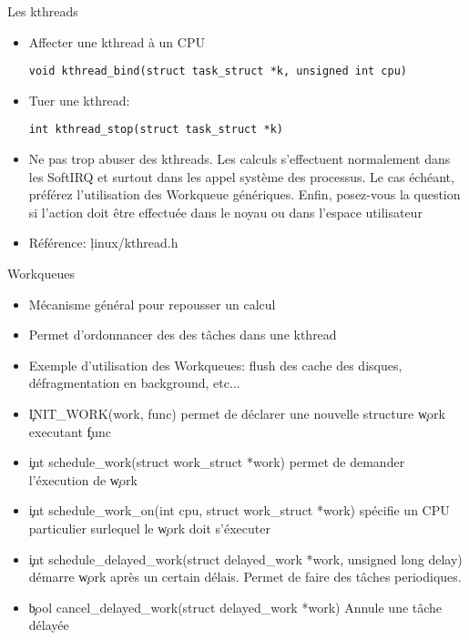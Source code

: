 \begin{frame}[fragile=singleslide]{Les kthreads}
  \begin{itemize}
  \item Affecter une kthread à un CPU
    \begin{lstlisting}
void kthread_bind(struct task_struct *k, unsigned int cpu)
    \end{lstlisting} 
  \item Tuer une kthread:
    \begin{lstlisting} 
int kthread_stop(struct task_struct *k)
    \end{lstlisting} 
  \item  Ne pas  trop abuser  des kthreads.  Les  calculs s'effectuent
    normalement dans les SoftIRQ et surtout dans les appel système des
    processus.  Le cas échéant,  préférez l'utilisation  des Workqueue
    génériques. Enfin,  posez-vous la  question si l'action  doit être
    effectuée dans le noyau ou dans l'espace utilisateur
  \item Référence: \c{linux/kthread.h}
  \end{itemize} 
\end{frame} 

\begin{frame}[fragile=singleslide]{Workqueues}
  \begin{itemize} 
  \item Mécanisme général pour repousser un calcul
  \item Permet d'ordonnancer des des tâches dans une kthread
  \item  Exemple d'utilisation  des  Workqueues: flush  des cache  des
    disques, défragmentation en background, etc...
  \item  \c{INIT_WORK(work,  func)} permet  de  déclarer une  nouvelle
    structure \c{work} executant \c{func}
  \item \c{int schedule_work(struct work_struct *work)} permet de
    demander l'éxecution de \c{work}
  \item  \c{int schedule_work_on(int  cpu, struct  work_struct *work)}
    spécifie un CPU particulier surlequel le \c{work} doit s'éxecuter
  \item
    \c{int schedule_delayed_work(struct delayed_work *work, unsigned long delay)}
    démarre \c{work} après un certain délais. Permet de faire des
    tâches periodiques.
  \item \c{bool cancel_delayed_work(struct delayed_work *work)} Annule
    une tâche délayée
  \end{itemize}
\end{frame}

